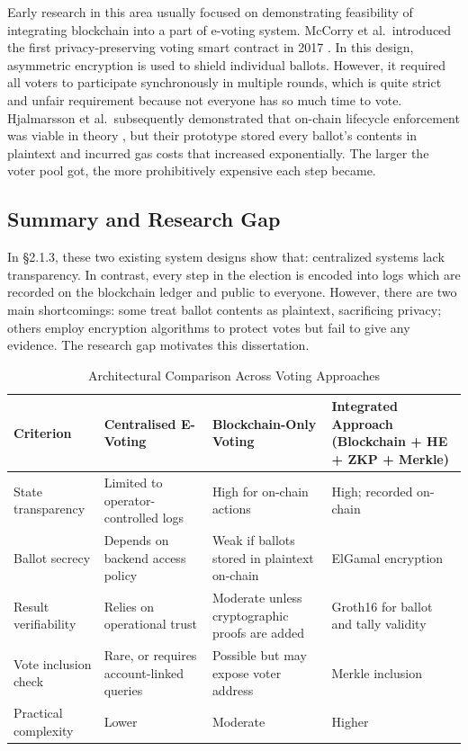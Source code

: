 Early research in this area usually focused on demonstrating feasibility of integrating blockchain into a part of e-voting system. McCorry et al.\ introduced the first privacy-preserving voting smart contract in 2017 \cite{mccorry2017}. In this design, asymmetric encryption is used to shield individual ballots. However, it required all voters to participate synchronously in multiple rounds, which is quite strict and unfair requirement because not everyone has so much time to vote. Hjalmarsson et al.\ subsequently demonstrated that on-chain lifecycle enforcement was viable in theory \cite{hjalmarsson2018}, but their prototype stored every ballot's contents in plaintext and incurred gas costs that increased exponentially. The larger the voter pool got, the more prohibitively expensive each step became.


\subsection{Summary and Research Gap}

In \S2.1.3, these two existing system designs show that: centralized systems lack transparency. In contrast, every step in the election is encoded into logs which are recorded on the blockchain ledger and public to everyone. However, there are two main shortcomings: some treat ballot contents as plaintext, sacrificing privacy; others employ encryption algorithms to protect votes but fail to give any evidence. The research gap motivates this dissertation.

\begin{table}[htbp]
\centering
\small
\caption{Architectural Comparison Across Voting Approaches}
\label{tab:approach-comparison}
\begin{tabular}{L{3.0cm} L{2.9cm} L{2.9cm} L{3.9cm}}
\toprule
Criterion & Centralised E-Voting \cite{springall2014,adida2008} & Blockchain-Only Voting \cite{mccorry2017,hjalmarsson2018} & Integrated Approach (Blockchain + HE + ZKP + Merkle) \\
\midrule
State transparency & Limited to operator-controlled logs & High for on-chain actions & High; recorded on-chain \\
Ballot secrecy & Depends on backend access policy & Weak if ballots stored in plaintext on-chain & ElGamal encryption \\
Result verifiability & Relies on operational trust & Moderate unless cryptographic proofs are added & Groth16 for ballot and tally validity \\
Vote inclusion check & Rare, or requires account-linked queries & Possible but may expose voter address & Merkle inclusion \\
Practical complexity & Lower & Moderate & Higher \\
\bottomrule
\end{tabular}
\end{table}

